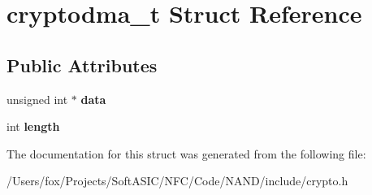 \hypertarget{structcryptodma__t}{
\section{cryptodma\_\-t Struct Reference}
\label{structcryptodma__t}
}
\subsection*{Public Attributes}
\begin{DoxyCompactItemize}
\item 
\hypertarget{structcryptodma__t_a2509a0a7bff0bbedac8d07d1f5a65781}{
unsigned int $\ast$ {\bfseries data}}
\label{structcryptodma__t_a2509a0a7bff0bbedac8d07d1f5a65781}

\item 
\hypertarget{structcryptodma__t_af208ad3e8b4f167ddec77d6a7ef3361a}{
int {\bfseries length}}
\label{structcryptodma__t_af208ad3e8b4f167ddec77d6a7ef3361a}

\end{DoxyCompactItemize}


The documentation for this struct was generated from the following file:\begin{DoxyCompactItemize}
\item 
/Users/fox/Projects/SoftASIC/NFC/Code/NAND/include/crypto.h\end{DoxyCompactItemize}
